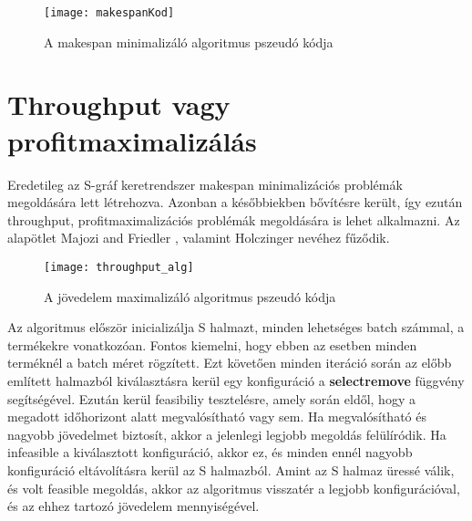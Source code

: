 \begin{figure}[H]
\begin{center}
\texttt{[image: makespanKod]}
\caption{A makespan minimalizáló algoritmus pszeudó kódja\cite{Hegyhati}}
\label{makespanKod}
\end{center}
\end{figure}

\section{Throughput vagy profitmaximalizálás}
Eredetileg az S-gráf keretrendszer makespan minimalizációs problémák megoldására lett létrehozva. Azonban a későbbiekben bővítésre került, így ezután throughput, profitmaximalizációs problémák megoldására is lehet alkalmazni. Az alapötlet Majozi and Friedler \cite{majozifriedler}, valamint Holczinger \cite{holczinger} nevéhez fűződik.
\begin{figure}[H]
\begin{center}
\texttt{[image: throughput\_alg]}
\caption{A jövedelem maximalizáló algoritmus pszeudó kódja \cite{Hegyhati}}
\label{throughput_alg}
\end{center}
\end{figure}
Az algoritmus először inicializálja S halmazt, minden lehetséges batch számmal, a termékekre vonatkozóan. Fontos kiemelni, hogy ebben az esetben minden terméknél a batch méret rögzített. Ezt követően minden iteráció során az előbb említett halmazból kiválasztásra kerül egy konfiguráció a \textbf{select\textunderscore remove} függvény segítségével. Ezután kerül feasibiliy tesztelésre, amely során eldől, hogy a megadott időhorizont alatt megvalósítható vagy sem. Ha megvalósítható és nagyobb jövedelmet biztosít, akkor a jelenlegi legjobb megoldás felülíródik. Ha infeasible a kiválasztott konfiguráció, akkor ez, és minden ennél nagyobb konfiguráció eltávolításra kerül az S halmazból. Amint az S halmaz üressé válik, és volt feasible megoldás, akkor az algoritmus visszatér a legjobb konfigurációval, és az ehhez tartozó jövedelem mennyiségével.

